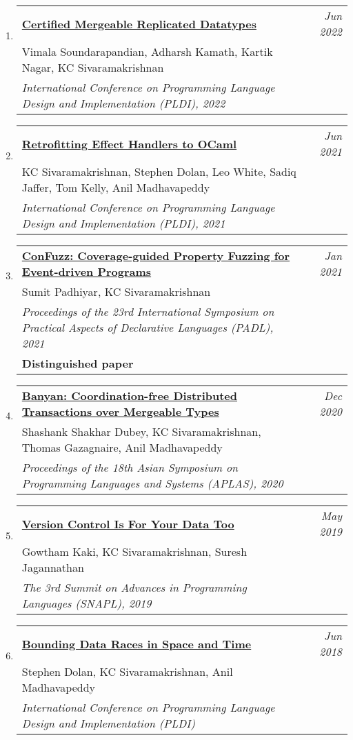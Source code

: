 \documentclass[10pt]{article}
\makeatletter
\newcommand{\lbar}[1]{{\color{#1}\ding{118}}\hspace*{2pt}}
\newenvironment{benumerate}[2]{
    \let\oldItem\item
    \def\item{\addtocounter{enumi}{-2}\oldItem}
    \begin{enumerate}[#2] \itemsep3pt
    \setcounter{enumi}{#1}
    \addtocounter{enumi}{1}}
  {\end{enumerate}}
\newenvironment{publication}[5]
{ \item
  \begin{tabular*}{7.5in}{p{6.3in}@{\extracolsep{\fill}}r}
    \href{#1}{\textbf{#2}} & \textit{#3}\\ #4 &\\ \textit{#5}&\\
  \end{tabular*}
} {}
\newenvironment{publicationNote}[6]
{ \item
  \begin{tabular*}{7.5in}{p{6.3in}@{\extracolsep{\fill}}r}
    \href{#1}{\textbf{#2}} & \textit{#3}\\ #4 &\\ \textit{#5}\\ \textbf{#6} \\
  \end{tabular*}
} {}
\newenvironment{region}[3]{%
  \vspace*{0.5ex}
  {\scalebox{1.4}{\textbf{#1}}}
  \begin{benumerate}{#3}{\color{RoyalBlue}#2}}
  {\end{benumerate}\vspace{0.8ex}}
\makeatother
\begin{document}
\begin{region} {\lbar{purple}Conference Publications}{{C}1}{17}

	\begin{publication} {https://kcsrk.info/papers/certified_mrdt.pdf}
		{Certified Mergeable Replicated Datatypes}
		{Jun 2022} {Vimala Soundarapandian, Adharsh Kamath, Kartik Nagar, KC Sivaramakrishnan}
		{International Conference on Programming Language Design and Implementation (PLDI), 2022}
  \end{publication}

	\begin{publication} {https://kcsrk.info/papers/retro-concurrency_pldi_21.pdf}
		{Retrofitting Effect Handlers to OCaml}
		{Jun 2021} {KC Sivaramakrishnan, Stephen Dolan, Leo White, Sadiq Jaffer, Tom Kelly, Anil Madhavapeddy}
		{International Conference on Programming Language Design and Implementation (PLDI), 2021}
  \end{publication}

	\begin{publicationNote} {https://kcsrk.info/papers/confuzz_padl21.pdf}
		{ConFuzz: Coverage-guided Property Fuzzing for Event-driven Programs}
		{Jan 2021} {Sumit Padhiyar, KC Sivaramakrishnan}
		{Proceedings of the 23rd International Symposium on Practical Aspects of Declarative Languages (PADL), 2021}
    {Distinguished paper}
  \end{publicationNote}

	\begin{publication} {https://kcsrk.info/papers/banyan_aplas20.pdf}
		{Banyan: Coordination-free Distributed Transactions over Mergeable Types}
		{Dec 2020} {Shashank Shakhar Dubey, KC Sivaramakrishnan, Thomas Gazagnaire, Anil Madhavapeddy}
		{Proceedings of the 18th Asian Symposium on Programming Languages and Systems (APLAS), 2020}
  \end{publication}

	\begin{publication} {http://kcsrk.info/papers/snapl19-mrdt.pdf}
		{Version Control Is For Your Data Too}
		{May 2019} {Gowtham Kaki, KC Sivaramakrishnan, Suresh Jagannathan}
		{The 3rd Summit on Advances in Programming Languages (SNAPL), 2019}
  \end{publication}

	\begin{publication} {http://kcsrk.info/papers/pldi18-memory.pdf}
		{Bounding Data Races in Space and Time}
		{Jun 2018} {Stephen Dolan, KC Sivaramakrishnan, Anil Madhavapeddy}
		{International Conference on Programming Language Design and Implementation (PLDI)}
  \end{publication}


\end{region}
\end{document}
